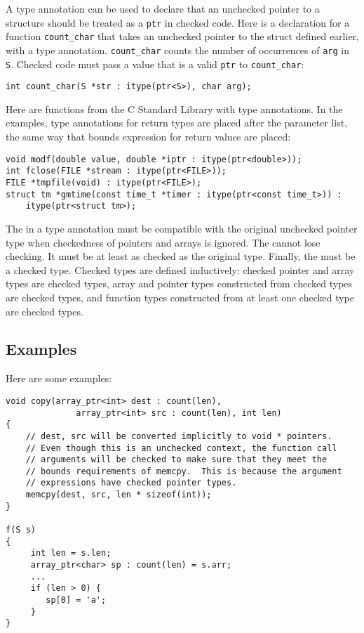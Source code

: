 A type annotation can be used to declare that an unchecked
pointer to a structure should be treated as a \lstinline+ptr+ in
checked code. Here is a declaration for a function
\lstinline+count_char+ that takes
an unchecked pointer to the struct  defined earlier,
with a type annotation. \lstinline+count_char+ counts the number
of occurrences of \lstinline+arg+ in \lstinline+S+. Checked code must pass a
value that is a valid \lstinline+ptr+ to \lstinline+count_char+:
\begin{lstlisting}
int count_char(S *str : itype(ptr<S>), char arg);
\end{lstlisting}

Here are functions from the C Standard Library with type annotations.
In the examples, type annotations for return types are placed 
after the parameter list, the same way that bounds expression for
return values are placed:
\begin{lstlisting}
void modf(double value, double *iptr : itype(ptr<double>));
int fclose(FILE *stream : itype(ptr<FILE>));
FILE *tmpfile(void) : itype(ptr<FILE>);
struct tm *gmtime(const time_t *timer : itype(ptr<const time_t>)) :
    itype(ptr<struct tm>);
\end{lstlisting}

The  in a type annotation must be compatible
with the original unchecked pointer type when checkedness
of pointers and arrays is ignored. The  cannot
lose checking.  It must be at least as checked as the
original type.  Finally, the  must be
a checked type.   Checked types are defined inductively:
checked pointer and array types are checked types,
array and pointer types constructed from checked types
are checked types, and function types constructed from
at least one checked type are checked types.

\subsection{Examples}
\label{section:bounds-safe-interface-examples}

Here are some examples:
\begin{lstlisting}
void copy(array_ptr<int> dest : count(len),
              array_ptr<int> src : count(len), int len)
{
    // dest, src will be converted implicitly to void * pointers.
    // Even though this is an unchecked context, the function call
    // arguments will be checked to make sure that they meet the
    // bounds requirements of memcpy.  This is because the argument
    // expressions have checked pointer types.
    memcpy(dest, src, len * sizeof(int));
}

f(S s) 
{
     int len = s.len;
     array_ptr<char> sp : count(len) = s.arr;
     ...
     if (len > 0) {
        sp[0] = 'a';
     }
}
\end{lstlisting}

